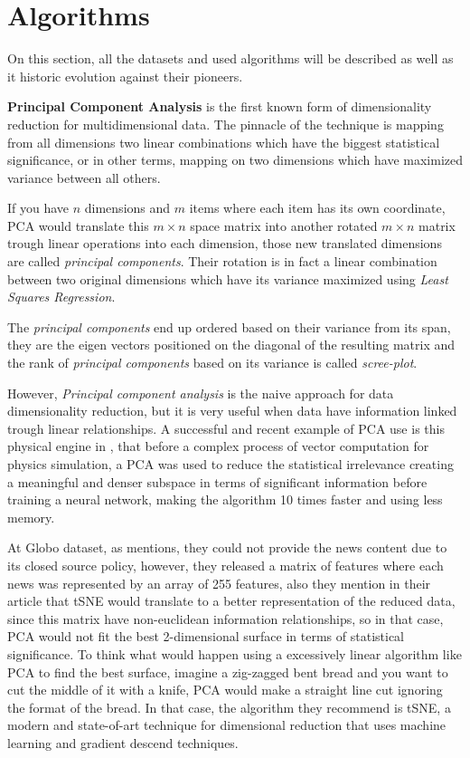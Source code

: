 \documentclass[ecp,tc,english]{iiufrgs}
\begin{document}
    \newpage
    \section{Algorithms} \label{algorithms}
    
    On this section, all the datasets and used algorithms will be described as well as it historic evolution against their pioneers.
        
    \textbf{Principal Component Analysis} \cite{hotelling1933}  is the first known form of dimensionality reduction for multidimensional data. The pinnacle of the technique is mapping from all dimensions two linear combinations which have the biggest statistical significance, or in other terms, mapping on two dimensions which have maximized variance between all others.
    
    If you have \(n\) dimensions and \(m\) items where each item has its own coordinate, PCA would translate this \(m \times n\) space matrix into another rotated \(m \times n\) matrix trough linear operations into each dimension, those new translated dimensions are called \textit{principal components}.
    Their rotation is in fact a linear combination between two original dimensions which have its variance maximized using \textit{Least Squares Regression}.
    
    The \textit{principal components} end up ordered based on their variance from its span, they are the eigen vectors positioned on the diagonal of the resulting matrix and the rank of \textit{principal components} based on its variance is called \textit{scree-plot}.

    However, \textit{Principal component analysis} is the naive approach for data dimensionality reduction, but it is very useful when data have information linked trough linear relationships.
    A successful and recent example of PCA use is this physical engine in \cite{holden2019}, that before a complex process of vector computation for physics simulation, a PCA was used to reduce the statistical irrelevance creating a meaningful and denser subspace in terms of significant information before training a neural network, making the algorithm 10 times faster and using less memory.
    
    At Globo dataset, as \cite{moreira2018} mentions, they could not provide the news content due to its closed source policy, however, they released a matrix of features where each news was represented by an array of 255 features, also they mention in their article that tSNE would translate to a better representation of the reduced data, since this matrix have non-euclidean information relationships, so in that case, PCA would not fit the best 2-dimensional surface in terms of statistical significance.
    To think what would happen using a excessively linear algorithm like PCA to find the best surface, imagine a zig-zagged bent bread and you want to cut the middle of it with a knife, PCA would make a straight line cut ignoring the format of the bread. In that case, the algorithm they recommend is tSNE, a modern and state-of-art technique for dimensional reduction that uses machine learning and gradient descend techniques.
    
\end{document}
